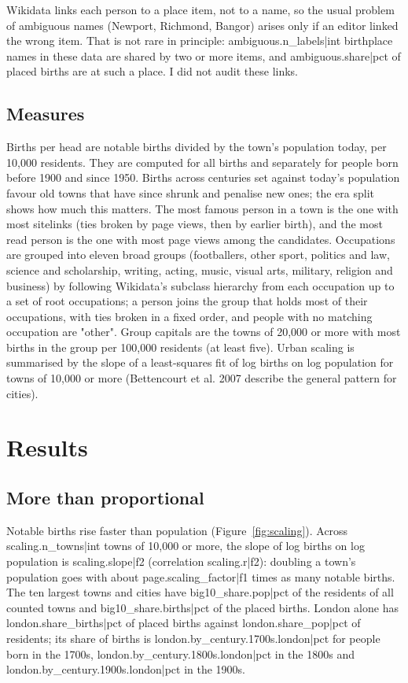\documentclass[11pt,a4paper]{article}
\begin{document}
Wikidata links each person to a place item, not to a name, so the usual problem of ambiguous names (Newport, Richmond, Bangor) arises only if an editor linked the wrong item. That is not rare in principle: {{ambiguous.n_labels|int}} birthplace names in these data are shared by two or more items, and {{ambiguous.share|pct}} of placed births are at such a place. I did not audit these links.

\subsection{Measures}

Births per head are notable births divided by the town's population today, per 10,000 residents. They are computed for all births and separately for people born before 1900 and since 1950. Births across centuries set against today's population favour old towns that have since shrunk and penalise new ones; the era split shows how much this matters. The most famous person in a town is the one with most sitelinks (ties broken by page views, then by earlier birth), and the most read person is the one with most page views among the candidates. Occupations are grouped into eleven broad groups (footballers, other sport, politics and law, science and scholarship, writing, acting, music, visual arts, military, religion and business) by following Wikidata's subclass hierarchy from each occupation up to a set of root occupations; a person joins the group that holds most of their occupations, with ties broken in a fixed order, and people with no matching occupation are "other". Group capitals are the towns of 20,000 or more with most births in the group per 100,000 residents (at least five). Urban scaling is summarised by the slope of a least-squares fit of log births on log population for towns of 10,000 or more (Bettencourt et al. 2007 describe the general pattern for cities).

\section{Results}

\subsection{More than proportional}

Notable births rise faster than population (Figure~\ref{fig:scaling}). Across {{scaling.n_towns|int}} towns of 10,000 or more, the slope of log births on log population is {{scaling.slope|f2}} (correlation {{scaling.r|f2}}): doubling a town's population goes with about {{page.scaling_factor|f1}} times as many notable births. The ten largest towns and cities have {{big10_share.pop|pct}} of the residents of all counted towns and {{big10_share.births|pct}} of the placed births. London alone has {{london.share_births|pct}} of placed births against {{london.share_pop|pct}} of residents; its share of births is {{london.by_century.1700s.london|pct}} for people born in the 1700s, {{london.by_century.1800s.london|pct}} in the 1800s and {{london.by_century.1900s.london|pct}} in the 1900s.
\end{document}
